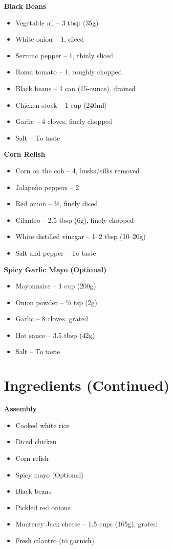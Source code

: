 \textbf{Black Beans}
\begin{itemize}
    \item[\measure] Vegetable oil – 3 tbsp (35g)
    \item[\cut] White onion – 1, diced
    \item[\cut] Serrano pepper – 1, thinly sliced
    \item[\cut] Roma tomato – 1, roughly chopped
    \item Black beans – 1 can (15-ounce), drained
    \item[\measure] Chicken stock – 1 cup (240ml)
    \item[\cut] Garlic – 4 cloves, finely chopped
    \item Salt – To taste
\end{itemize}

\textbf{Corn Relish}
\begin{itemize}
    \item[\cut] Corn on the cob – 4, husks/silks removed
    \item[\cut] Jalapeño peppers – 2
    \item[\cut] Red onion – ½, finely diced
    \item[\cut] Cilantro – 2.5 tbsp (6g), finely chopped
    \item[\measure] White distilled vinegar – 1–2 tbsp (10–20g)
    \item Salt and pepper – To taste
\end{itemize}

\textbf{Spicy Garlic Mayo (Optional)}
\begin{itemize}
    \item[\measure] Mayonnaise – 1 cup (200g)
    \item[\measure] Onion powder – ½ tsp (2g)
    \item[\cut] Garlic – 8 cloves, grated
    \item[\measure] Hot sauce – 3.5 tbsp (42g)
    \item Salt – To taste
\end{itemize}

\newpage

\section*{Ingredients (Continued)}

\textbf{Assembly}
\begin{itemize}
    \item Cooked white rice
    \item Diced chicken
    \item Corn relish
    \item Spicy mayo (Optional)
    \item Black beans
    \item Pickled red onions
    \item[\cut] Monterey Jack cheese – 1.5 cups (165g), grated
    \item[\cut] Fresh cilantro (to garnish)
\end{itemize}


